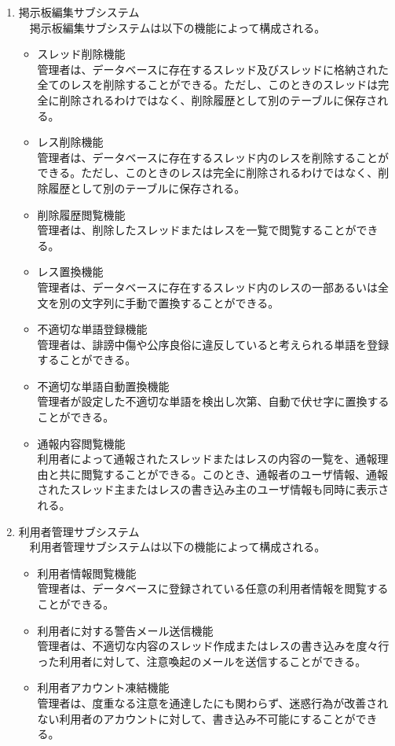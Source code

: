 \documentclass[a4j]{jarticle}
\begin{document}
\begin{enumerate}
  \item 掲示板編集サブシステム\\
  　掲示板編集サブシステムは以下の機能によって構成される。
  \begin{itemize}
    \item スレッド削除機能\\
    管理者は、データベースに存在するスレッド及びスレッドに格納された全てのレスを削除することができる。ただし、このときのスレッドは完全に削除されるわけではなく、削除履歴として別のテーブルに保存される。
    \item レス削除機能\\
    管理者は、データベースに存在するスレッド内のレスを削除することができる。ただし、このときのレスは完全に削除されるわけではなく、削除履歴として別のテーブルに保存される。
    \item 削除履歴閲覧機能\\
    管理者は、削除したスレッドまたはレスを一覧で閲覧することができる。
    \item レス置換機能\\
    管理者は、データベースに存在するスレッド内のレスの一部あるいは全文を別の文字列に手動で置換することができる。
    \item 不適切な単語登録機能\\
    管理者は、誹謗中傷や公序良俗に違反していると考えられる単語を登録することができる。
    \item 不適切な単語自動置換機能\\
    管理者が設定した不適切な単語を検出し次第、自動で伏せ字に置換することができる。
    \item 通報内容閲覧機能\\
    利用者によって通報されたスレッドまたはレスの内容の一覧を、通報理由と共に閲覧することができる。このとき、通報者のユーザ情報、通報されたスレッド主またはレスの書き込み主のユーザ情報も同時に表示される。\\
  \end{itemize}


  \item 利用者管理サブシステム\\
  　利用者管理サブシステムは以下の機能によって構成される。
  \begin{itemize}
    \item 利用者情報閲覧機能\\
    管理者は、データベースに登録されている任意の利用者情報を閲覧することができる。
    \item 利用者に対する警告メール送信機能\\
    管理者は、不適切な内容のスレッド作成またはレスの書き込みを度々行った利用者に対して、注意喚起のメールを送信することができる。
    \item 利用者アカウント凍結機能\\
    管理者は、度重なる注意を通達したにも関わらず、迷惑行為が改善されない利用者のアカウントに対して、書き込み不可能にすることができる。\\
  \end{itemize}



\end{enumerate}
\end{document}
